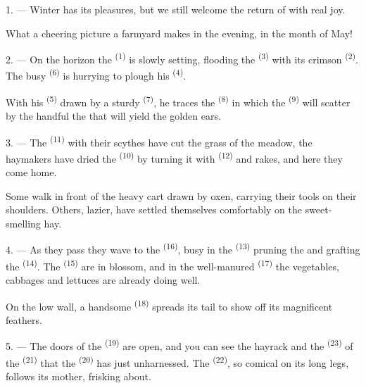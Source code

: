 \VUsaut{3.0mm}
\VUsaut{3.0mm}

\VUsaut{4.0mm}

1. --- Winter has its pleasures, but we still welcome the return of
 with real joy.

What a cheering picture a farmyard makes in the evening, in the month of May!

2. --- On the horizon the  \textsuperscript{(1)} is slowly setting, flooding the
 \textsuperscript{(3)} with its crimson
 \textsuperscript{(2)}. The busy  \textsuperscript{(6)} is
hurrying to plough his  \textsuperscript{(4)}.

With his  \textsuperscript{(5)} drawn by a sturdy 
\textsuperscript{(7)}, he traces the  \textsuperscript{(8)} in which the
 \textsuperscript{(9)} will scatter by the handful the 
that will yield the golden ears.

3. --- The  \textsuperscript{(11)} with their scythes have cut the grass of the
meadow, the haymakers have dried the  \textsuperscript{(10)} by turning it with
 \textsuperscript{(12)} and rakes, and here they come home.

Some walk in front of the heavy cart drawn by oxen, carrying their tools on their shoulders.
Others, lazier, have settled themselves comfortably on the sweet-smelling hay.

4. --- As they pass they wave to the  \textsuperscript{(16)}, busy in the
 \textsuperscript{(13)} pruning the
 and grafting the  \textsuperscript{(14)}. The
 \textsuperscript{(15)} are in blossom, and in the
well-manured  \textsuperscript{(17)} the vegetables, cabbages and
lettuces are already doing well.

On the low wall, a handsome  \textsuperscript{(18)} spreads its tail to show
off its magnificent feathers.

\VUsaut{3.0mm}

5. --- The doors of the  \textsuperscript{(19)} are open, and you can see the
hayrack and the  \textsuperscript{(23)} of the
 \textsuperscript{(21)} that the  \textsuperscript{(20)} has just
unharnessed. The  \textsuperscript{(22)}, so comical on its long legs, follows
its mother, frisking about.

